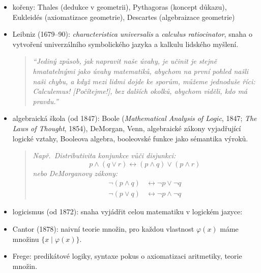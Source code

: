 \begin{itemize}
    
    \item kořeny: Thales (dedukce v geometrii), Pythagoras (koncept důkazu), Eukleidés (axiomatizace geometrie), Descartes (algebraizace geometrie)
    
    \item Leibniz (1679--90):  \emph{characteristica universalis} a \emph{calculus ratiocinator}, snaha o vytvoření univerzálního symbolického jazyka a kalkulu lidského myšlení.

        \begin{quote}\it
            ``Jediný způsob, jak napravit naše úvahy, je učinit je stejně hmatatelnými jako úvahy matematiků, abychom na první pohled našli naši chybu, a když mezi lidmi dojde ke sporům, můžeme jednoduše říci: Calculemus! [Počítejme!], bez dalších okolků, abychom viděli, kdo má pravdu.'' 
        \end{quote}
    
    \item algebraická škola (od 1847): Boole (\emph{Mathematical Analysis of Logic}, 1847; \emph{The Laws of Thought}, 1854), DeMorgan, Venn, algebraické zákony vyjadřující logické vztahy, Booleova algebra, booleovské funkce jako sémantika výroků.
    
        \begin{quote}\it
            Např.\ Distributivita konjunkce vůči disjunkci: 
            \[ 
                p \land (q \lor r) \leftrightarrow (p \land q) \lor (p \land r ) 
                \]
            nebo DeMorganovy zákony: 
            \begin{align*}
                \neg(p \land q) &\leftrightarrow \neg p \lor \neg q \\
                \neg(p \lor q) &\leftrightarrow \neg p \land \neg q                
            \end{align*} 
        \end{quote}

    \item logicismus (od 1872): snaha vyjádřit celou matematiku v logickém jazyce:

    \item Cantor (1878): naivní teorie množin, pro každou vlastnost \( \varphi(x) \) máme množinu \( \{x\mid\varphi(x)\} \).
            
    \item Frege: predikátové logiky, syntaxe pokus o axiomatizaci aritmetiky, teorie množin.
            

\end{itemize}
